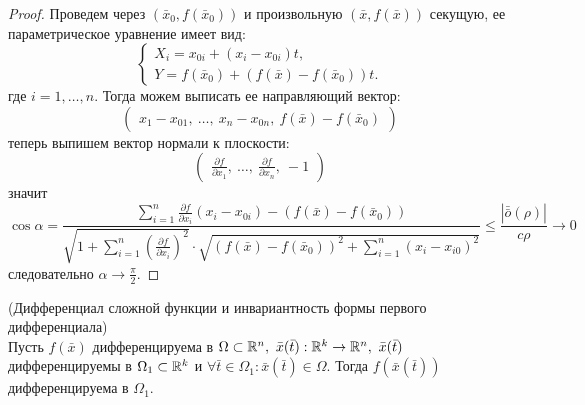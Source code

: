 \begin{proof}
    Проведем через $(\bar{x}_0, f(\bar{x}_0))$ и произвольную $(\bar{x}, f(\bar{x}))$ секущую, ее параметрическое уравнение имеет вид:
    \[\begin{cases}
        X_i=x_{0i}+(x_i-x_{0i})t,\\
        Y=f(\bar{x}_0)+(f(\bar{x})-f(\bar{x}_0))t.
    \end{cases}
    \]
    где $i=1,\dots,n$. Тогда можем выписать ее направляющий вектор:
    \[\begin{pmatrix}
        x_1-x_{01},\ \dots,\ x_n-x_{0n},\ f(\bar{x})-f(\bar{x}_0)
    \end{pmatrix}
    \]
    теперь выпишем вектор нормали к плоскости:
    \[\begin{pmatrix}
        \frac{\partial {f}}{\partial {x_1}},\ \dots,\ \frac{\partial {f}}{\partial {x_n}},\ -1
    \end{pmatrix}
    \]
    значит
    \[\cos{\alpha}=\frac{\sum\limits_{i=1}^{n}\frac{\partial {f}}{\partial {x_i}}(x_i-x_{0i})-(f(\bar{x})-f(\bar{x}_0))}{\sqrt{1+\sum\limits_{i=1}^{n}(\frac{\partial {f}}{\partial {x_i}})^2}\cdot \sqrt{(f(\bar{x})-f(\bar{x}_0))^2+\sum\limits_{i=1}^{n}(x_i-x_{i0})^2}}\leq \frac{|\bar{\bar{o}}{(\rho)}|}{c\rho}\to 0\]
    следовательно $\alpha \to \frac{\pi}{2}$.
\end{proof} 
\begin{theorem} (Дифференциал сложной функции и инвариантность формы первого дифференциала)\\
    Пусть $f(\bar{x})$ дифференцируема в $\Omega\subset \R^n,\ \bar{x}(\bar{t}): \R^k\to \R^n,\ \bar{x}(\bar{t})$ дифференцируемы в $\Omega_1\subset \mathbb{R}^k$ и $\forall \bar{t}\in \Omega_1: \bar{x}(\bar{t})\in \Omega$. Тогда $f(\bar{x}(\bar{t}))$ дифференцируема в $\Omega_1$.
\end{theorem} 
